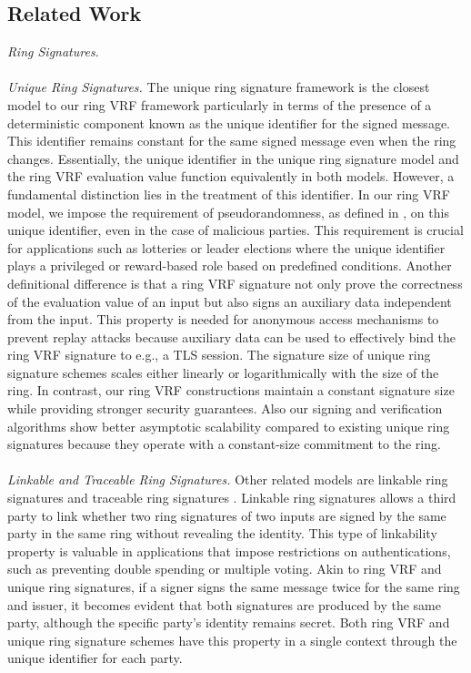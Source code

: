 
\subsection{Related Work}

\noindent\textit{Ring Signatures.}
\\\\
\noindent\textit{Unique Ring Signatures.} The unique ring signature framework \cite{URCframework} is the closest model to our ring VRF framework particularly in terms of the presence of a deterministic component known as the unique identifier for the signed message. This identifier remains constant for the same signed message even when the ring changes.  Essentially, the unique identifier in the unique ring signature model and the ring VRF evaluation value function equivalently in both models. However, a fundamental distinction lies in the treatment of this identifier. In our ring VRF model, we impose the requirement of pseudorandomness, as defined in \cite{ucvrf,praos}, on this unique identifier, even in the case of malicious parties.
This requirement is crucial for applications such as lotteries or leader elections where the unique identifier plays a privileged or reward-based role based on predefined conditions. Another definitional difference is that a ring VRF  signature not only prove the correctness of the evaluation value of an input but also signs an auxiliary data independent from the input. This property is needed for anonymous access mechanisms to prevent replay attacks because auxiliary data can be used to effectively bind the ring VRF signature to e.g., a TLS session.
The signature size of unique ring signature schemes scales either linearly \cite{URCframework,URCfc} or logarithmically  \cite{URCblockchainprivacy,URClattice} with the size of the ring. In contrast, our ring VRF constructions maintain a constant signature size while providing stronger security guarantees. Also our signing and verification algorithms show better asymptotic scalability compared to existing unique ring signatures because they operate with a constant-size  commitment to the ring.
\\\\
\noindent\textit{Linkable and Traceable Ring Signatures.} Other related models are linkable ring signatures \cite{ring_linkable,ring_linkablee} and traceable ring signatures \cite{traceable07,traceable_sub}. Linkable ring signatures allows a third party to link whether two ring signatures of two inputs are signed by the same party in the same ring without revealing the identity. This type of linkability property is valuable in applications that impose restrictions on authentications, such as preventing double spending or multiple voting. Akin to ring VRF and unique ring signatures, if a signer signs the same message twice for the same ring and issuer, it becomes evident that both signatures are produced by the same party, although the specific party's identity remains secret. Both ring VRF and unique ring signature schemes have this property in a single context through the unique identifier for each party.
